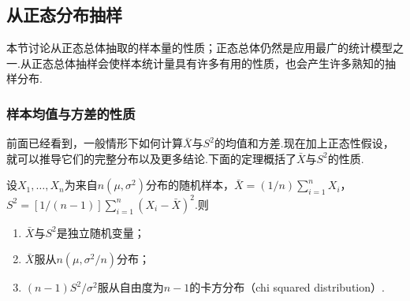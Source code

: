 \subsection{从正态分布抽样}\label{sec:5.3}
本节讨论从正态总体抽取的样本量的性质；正态总体仍然是应用最广的统计模型之一.从正态总体抽样会使样本统计量具有许多有用的性质，也会产生许多熟知的抽样分布.
\subsubsection{样本均值与方差的性质}\label{sec:5.3.1}
前面已经看到，一般情形下如何计算$\bar X$与$S^2$的均值和方差.现在加上正态性假设，就可以推导它们的完整分布以及更多结论.下面的定理概括了$\bar X$与$S^2$的性质.
\begin{theorem}\label{thm:5.3.1}
设$X_1,\ldots,X_n$为来自$n(\mu,\sigma^2)$分布的随机样本，$\bar X=(1/n)\sum_{i=1}^nX_i$，$S^2=[1/(n-1)]\sum_{i=1}^n(X_i-\bar X)^2$.则
\begin{enumerate}[label=\textbf{\alph*.}]
\item\label{item:5.3.1a} $\bar X$与$S^2$是独立随机变量；
\item\label{item:5.3.1b} $\bar X$服从$n(\mu,\sigma^2/n)$分布；
\item\label{item:5.3.1c} $(n-1)S^2/\sigma^2$服从自由度为$n-1$的卡方分布（chi squared distribution）.
\end{enumerate}
\end{theorem}
